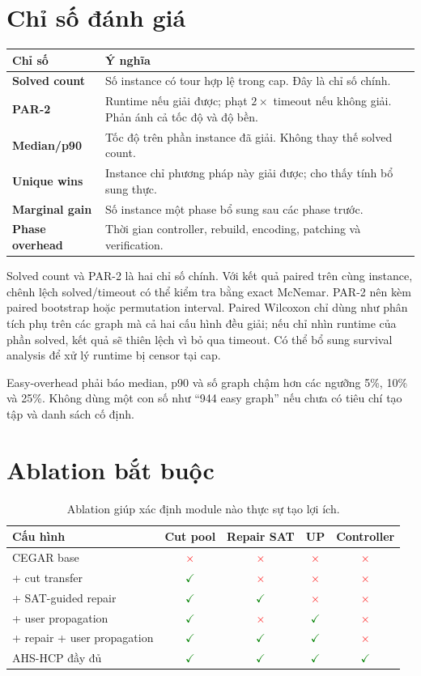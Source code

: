 \documentclass[11pt,a4paper,oneside]{scrreprt}
\newcommand{\yes}{\textcolor{green}{\ensuremath{\checkmark}}}
\newcommand{\no}{\textcolor{red}{\ensuremath{\times}}}
\begin{document}
\section{Chỉ số đánh giá}

\begin{tabularx}{\textwidth}{>{\bfseries\sffamily}p{30mm} X}
\toprule
Chỉ số & Ý nghĩa \\
\midrule
Solved count & Số instance có tour hợp lệ trong cap. Đây là chỉ số chính. \\
PAR-2 & Runtime nếu giải được; phạt $2\times$ timeout nếu không giải. Phản ánh cả tốc độ và độ bền. \\
Median/p90 & Tốc độ trên phần instance đã giải. Không thay thế solved count. \\
Unique wins & Instance chỉ phương pháp này giải được; cho thấy tính bổ sung thực. \\
Marginal gain & Số instance một phase bổ sung sau các phase trước. \\
Phase overhead & Thời gian controller, rebuild, encoding, patching và verification. \\
\bottomrule
\end{tabularx}

Solved count và PAR-2 là hai chỉ số chính. Với kết quả paired trên cùng instance, chênh lệch solved/timeout có thể kiểm tra bằng exact McNemar. PAR-2 nên kèm paired bootstrap hoặc permutation interval. Paired Wilcoxon chỉ dùng như phân tích phụ trên các graph mà cả hai cấu hình đều giải; nếu chỉ nhìn runtime của phần solved, kết quả sẽ thiên lệch vì bỏ qua timeout. Có thể bổ sung survival analysis để xử lý runtime bị censor tại cap.

Easy-overhead phải báo median, p90 và số graph chậm hơn các ngưỡng 5\%, 10\% và 25\%. Không dùng một con số như ``944 easy graph'' nếu chưa có tiêu chí tạo tập và danh sách cố định.

\section{Ablation bắt buộc}

\begin{table}[H]
\centering
\begin{tabularx}{\textwidth}{X c c c c}
\toprule
Cấu hình & Cut pool & Repair SAT & UP & Controller \\
\midrule
CEGAR base & \no & \no & \no & \no \\
+ cut transfer & \yes & \no & \no & \no \\
+ SAT-guided repair & \yes & \yes & \no & \no \\
+ user propagation & \yes & \no & \yes & \no \\
+ repair + user propagation & \yes & \yes & \yes & \no \\
AHS-HCP đầy đủ & \yes & \yes & \yes & \yes \\
\bottomrule
\end{tabularx}
\caption{Ablation giúp xác định module nào thực sự tạo lợi ích.}
\end{table}
\end{document}

